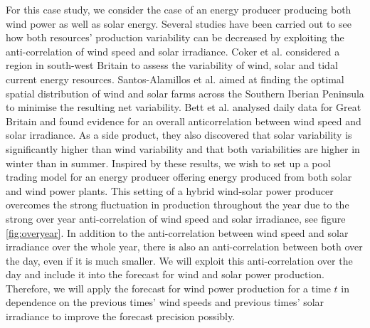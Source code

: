 For this case study, we consider the case of an energy producer producing both wind power as well as solar energy. Several studies have been carried out to see how both resources' production variability  can be decreased by exploiting the anti-correlation of wind speed and solar irradiance. Coker et al. \cite{Coker2013} considered a region in south-west Britain to assess the variability of wind, solar and tidal current energy resources. Santos-Alamillos et al. \cite{Santos-Alamillos} aimed at finding the optimal spatial distribution of wind and solar farms across the Southern Iberian Peninsula to minimise the resulting net variability. Bett et al. \cite{BETT16} analysed daily data for Great Britain and found  evidence for an overall anticorrelation between wind speed and solar irradiance. As a side product, they also discovered that solar variability is significantly higher than wind variability and that both variabilities are higher in winter than in summer. Inspired by these results, we wish to set up a pool trading model for an energy producer offering energy produced from both solar and wind power plants.  
This setting of a hybrid wind-solar power producer
	overcomes the strong fluctuation in production throughout the year due to the strong over year anti-correlation of wind speed and solar irradiance, see figure \ref{fig:overyear}. In addition to
	the anti-correlation between wind speed and solar irradiance over the whole year, there is also an anti-correlation between both over the day, even if it is much smaller. We will exploit this anti-correlation over the day and include it into the forecast
	for wind and solar power production. Therefore, we will apply the forecast for wind power production for a time $t$ in dependence on the previous times' wind speeds and previous times' solar irradiance to improve the forecast precision possibly.

